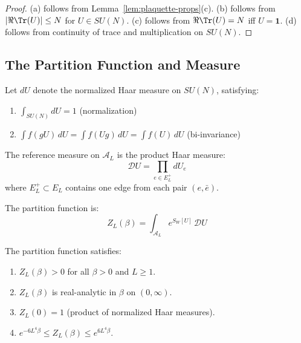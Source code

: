 \begin{proof}
(a) follows from Lemma~\ref{lem:plaquette-props}(c).
(b) follows from $|\Re\Tr(U)| \leq N$ for $U \in SU(N)$.
(c) follows from $\Re\Tr(U) = N$ iff $U = \mathbf{1}$.
(d) follows from continuity of trace and multiplication on $SU(N)$.
\end{proof}

\subsection{The Partition Function and Measure}

\begin{definition}
\label{def:haar}
Let $dU$ denote the normalized Haar measure on $SU(N)$, satisfying:
\begin{enumerate}[label=(\alph*)]
    \item $\int_{SU(N)} dU = 1$ (normalization)
    \item $\int f(gU) \, dU = \int f(Ug) \, dU = \int f(U) \, dU$ (bi-invariance)
\end{enumerate}
\end{definition}

\begin{definition}
\label{def:product-measure}
The reference measure on $\mathcal{A}_L$ is the product Haar measure:
\[
\mathcal{D}U = \prod_{e \in E_L^+} dU_e
\]
where $E_L^+ \subset E_L$ contains one edge from each pair $(e, \bar{e})$.
\end{definition}

\begin{definition}
\label{def:partition}
The partition function is:
\[
Z_L(\beta) = \int_{\mathcal{A}_L} e^{S_W[U]} \, \mathcal{D}U
\]
\end{definition}

\begin{proposition}
\label{prop:partition-props}
The partition function satisfies:
\begin{enumerate}[label=(\alph*)]
    \item $Z_L(\beta) > 0$ for all $\beta > 0$ and $L \geq 1$.
    \item $Z_L(\beta)$ is real-analytic in $\beta$ on $(0, \infty)$.
    \item $Z_L(0) = 1$ (product of normalized Haar measures).
    \item $e^{-6L^4\beta} \leq Z_L(\beta) \leq e^{6L^4\beta}$.
\end{enumerate}
\end{proposition}

